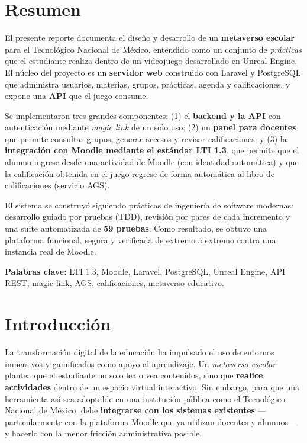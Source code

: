 \documentclass[12pt,letterpaper,oneside]{report}
\begin{document}
\chapter*{Resumen}
El presente reporte documenta el diseño y desarrollo de un \textbf{metaverso
escolar} para el Tecnológico Nacional de México, entendido como un conjunto de
\emph{prácticas} que el estudiante realiza dentro de un videojuego desarrollado
en Unreal Engine. El núcleo del proyecto es un \textbf{servidor web} construido
con Laravel y PostgreSQL que administra usuarios, materias, grupos, prácticas,
agenda y calificaciones, y expone una \textbf{API} que el juego consume.

Se implementaron tres grandes componentes: (1) el \textbf{backend y la API} con
autenticación mediante \emph{magic link} de un solo uso; (2) un \textbf{panel
para docentes} que permite consultar grupos, generar accesos y revisar
calificaciones; y (3) la \textbf{integración con Moodle mediante el estándar LTI
1.3}, que permite que el alumno ingrese desde una actividad de Moodle (con
identidad automática) y que la calificación obtenida en el juego regrese de
forma automática al libro de calificaciones (servicio AGS).

El sistema se construyó siguiendo prácticas de ingeniería de software modernas:
desarrollo guiado por pruebas (TDD), revisión por pares de cada incremento y una
suite automatizada de \textbf{59 pruebas}. Como resultado, se obtuvo una
plataforma funcional, segura y verificada de extremo a extremo contra una
instancia real de Moodle.

\medskip
\noindent\textbf{Palabras clave:} LTI 1.3, Moodle, Laravel, PostgreSQL, Unreal
Engine, API REST, magic link, AGS, calificaciones, metaverso educativo.

\tableofcontents
\listoffigures
\lstlistoflistings

\clearpage
{}

\chapter{Introducción}

La transformación digital de la educación ha impulsado el uso de entornos
inmersivos y gamificados como apoyo al aprendizaje. Un \emph{metaverso escolar}
plantea que el estudiante no solo lea o vea contenidos, sino que \textbf{realice
actividades} dentro de un espacio virtual interactivo. Sin embargo, para que una
herramienta así sea adoptable en una institución pública como el Tecnológico
Nacional de México, debe \textbf{integrarse con los sistemas existentes} —
particularmente con la plataforma Moodle que ya utilizan docentes y alumnos— y
hacerlo con la menor fricción administrativa posible.
\end{document}
